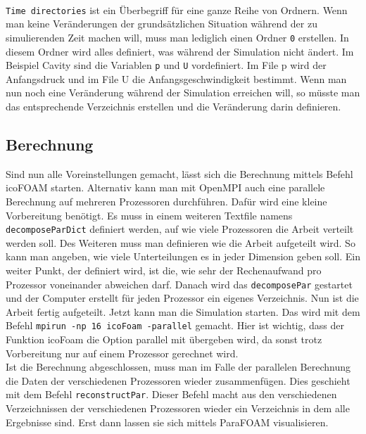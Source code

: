 \begin{refsection}
\begin{minipage}{0.5 \linewidth}
\end{minipage}
\\
\texttt{Time directories} ist ein Überbegriff für eine ganze Reihe von Ordnern. Wenn man keine Veränderungen der grundsätzlichen Situation während der zu simulierenden Zeit machen will, muss man lediglich einen Ordner  \texttt{0} erstellen. In diesem Ordner wird alles definiert, was während der Simulation nicht ändert. Im Beispiel Cavity sind die Variablen  \texttt{p} und  \texttt{U} vordefiniert. Im File p wird der Anfangsdruck und im File U die Anfangsgeschwindigkeit bestimmt. Wenn man nun noch eine Veränderung während der Simulation erreichen will, so müsste man das entsprechende Verzeichnis erstellen und die Veränderung darin definieren. 
 \subsection{Berechnung}
 Sind nun alle Voreinstellungen gemacht, lässt sich die Berechnung mittels Befehl icoFOAM starten. Alternativ kann man mit OpenMPI auch eine parallele Berechnung auf mehreren Prozessoren durchführen. Dafür wird eine kleine Vorbereitung benötigt. Es muss in einem weiteren Textfile namens \texttt{decomposeParDict} definiert werden, auf wie viele Prozessoren die Arbeit verteilt werden soll. Des Weiteren muss man definieren wie die Arbeit aufgeteilt wird. So kann man angeben, wie viele Unterteilungen es in jeder Dimension geben soll. Ein weiter Punkt, der definiert wird, ist die, wie sehr der Rechenaufwand pro Prozessor voneinander abweichen darf. Danach wird das \texttt{decomposePar} gestartet und der Computer erstellt für jeden Prozessor ein eigenes Verzeichnis. Nun ist die Arbeit fertig aufgeteilt. Jetzt kann man die Simulation starten. Das wird mit dem Befehl \texttt{mpirun -np 16 icoFoam -parallel} gemacht. Hier ist wichtig, dass der Funktion icoFoam die Option parallel mit übergeben wird, da sonst trotz Vorbereitung nur auf einem Prozessor gerechnet wird.\\
 Ist die Berechnung abgeschlossen, muss man im Falle der parallelen Berechnung die Daten der verschiedenen Prozessoren wieder zusammenfügen. Dies geschieht mit dem Befehl \texttt{reconstructPar}. Dieser Befehl macht aus den verschiedenen Verzeichnissen der verschiedenen Prozessoren wieder ein Verzeichnis in dem alle Ergebnisse sind. Erst dann lassen sie sich mittels ParaFOAM visualisieren. 

\end{refsection}
